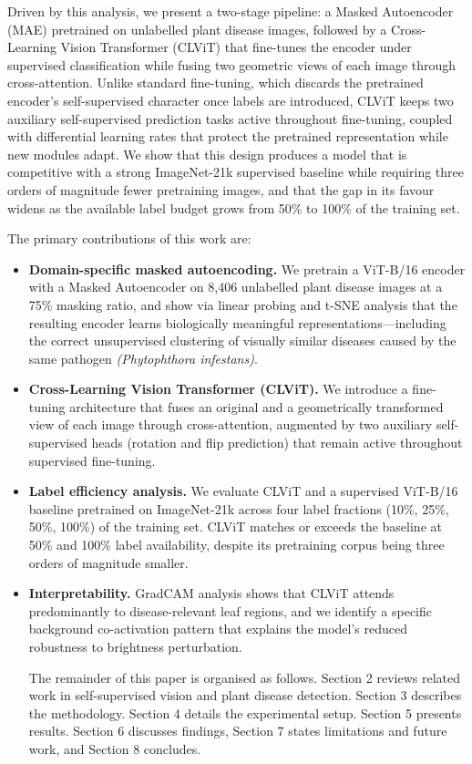\documentclass[conference]{IEEEtran}
\begin{document}
Driven by this analysis, we present a two-stage pipeline: a Masked Autoencoder (MAE) pretrained on unlabelled plant disease images, followed by a Cross-Learning Vision Transformer (CLViT) that fine-tunes the encoder under supervised classification while fusing two geometric views of each image through cross-attention. Unlike standard fine-tuning, which discards the pretrained encoder's self-supervised character once labels are introduced, CLViT keeps two auxiliary self-supervised prediction tasks active throughout fine-tuning, coupled with differential learning rates that protect the pretrained representation while new modules adapt. We show that this design produces a model that is competitive with a strong ImageNet-21k supervised baseline while requiring three orders of magnitude fewer pretraining images, and that the gap in its favour widens as the available label budget grows from 50\% to 100\% of the training set.


The primary contributions of this work are:

\begin{itemize}
\item \textbf{Domain-specific masked autoencoding.} We pretrain a ViT-B/16 encoder with a Masked Autoencoder on 8,406 unlabelled plant disease images at a 75\% masking ratio, and show via linear probing and t-SNE analysis that the resulting encoder learns biologically meaningful representations—including the correct unsupervised clustering of visually similar diseases caused by the same pathogen \textit{(Phytophthora infestans)}.
\item \textbf{Cross-Learning Vision Transformer (CLViT).} We introduce a fine-tuning architecture that fuses an original and a geometrically transformed view of each image through cross-attention, augmented by two auxiliary self-supervised heads (rotation and flip prediction) that remain active throughout supervised fine-tuning.
\item \textbf{Label efficiency analysis.} We evaluate CLViT and a supervised ViT-B/16 baseline pretrained on ImageNet-21k across four label fractions (10\%, 25\%, 50\%, 100\%) of the training set. CLViT matches or exceeds the baseline at 50\% and 100\% label availability, despite its pretraining corpus being three orders of magnitude smaller.
\item \textbf{Interpretability. }GradCAM analysis shows that CLViT attends predominantly to disease-relevant leaf regions, and we identify a specific background co-activation pattern that explains the model's reduced robustness to brightness perturbation.

The remainder of this paper is organised as follows. Section 2 reviews related work in self-supervised vision and plant disease detection. Section 3 describes the methodology. Section 4 details the experimental setup. Section 5 presents results. Section 6 discusses findings, Section 7 states limitations and future work, and Section 8 concludes.
\end{itemize}
\end{document}
